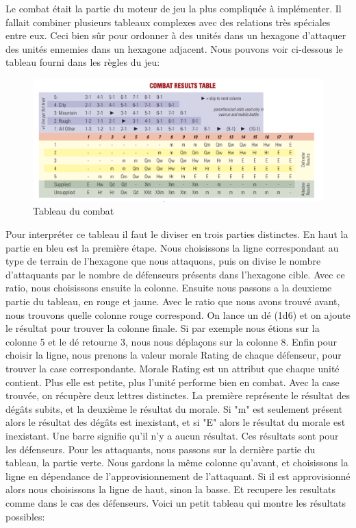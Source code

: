 Le combat était la partie du moteur de jeu la plus compliquée à implémenter.
Il fallait combiner plusieurs tableaux complexes avec des relations très spéciales entre eux.
Ceci bien sûr pour ordonner à des unités dans un hexagone d'attaquer des unités ennemies dans un hexagone adjacent.
Nous pouvons voir ci-dessous le tableau fourni dans les règles du jeu:

\begin{figure}[H]
\centering
\includegraphics[scale=0.25]{data/tableau_combat.png}
\caption{Tableau du combat}
\end{figure}

Pour interpréter ce tableau il faut le diviser en trois parties distinctes. En haut la partie en bleu est la première étape.
Nous choisissons la ligne correspondant au type de terrain de l'hexagone que nous attaquons, puis on divise le nombre
d'attaquants par le nombre de défenseurs présents dans l'hexagone cible. Avec ce ratio, nous choisissons ensuite la colonne.
Ensuite nous passons a la deuxieme partie du tableau, en rouge et jaune. Avec le ratio que nous avons trouvé avant,
nous trouvons quelle colonne rouge correspond. On lance un dé (1d6) et on ajoute le résultat pour trouver la colonne finale.
Si par exemple nous étions sur la colonne 5 et le dé retourne 3, nous nous déplaçons sur la colonne 8.
Enfin pour choisir la ligne, nous prenons la valeur morale Rating de chaque défenseur, pour trouver la case correspondante.
Morale Rating est un attribut que chaque unité contient. Plus elle est petite, plus l'unité performe bien en combat.
Avec la case trouvée, on récupère deux lettres distinctes. La première représente le résultat des dégâts subits, et la deuxième le résultat du morale.
Si "m" est seulement présent alors le résultat des dégâts est inexistant, et si "E" alors le résultat du morale est inexistant.
Une barre signifie qu'il n'y a aucun résultat. Ces résultats sont pour les défenseurs.
Pour les attaquants, nous passons sur la dernière partie du tableau, la partie verte.
Nous gardons la même colonne qu'avant, et choisissons la ligne en dépendance de l'approvisionnement de l'attaquant.
Si il est approvisionné alors nous choisissons la ligne de haut, sinon la basse. Et recupere les resultats comme dans le cas des défenseurs.
Voici un petit tableau qui montre les résultats possibles:


